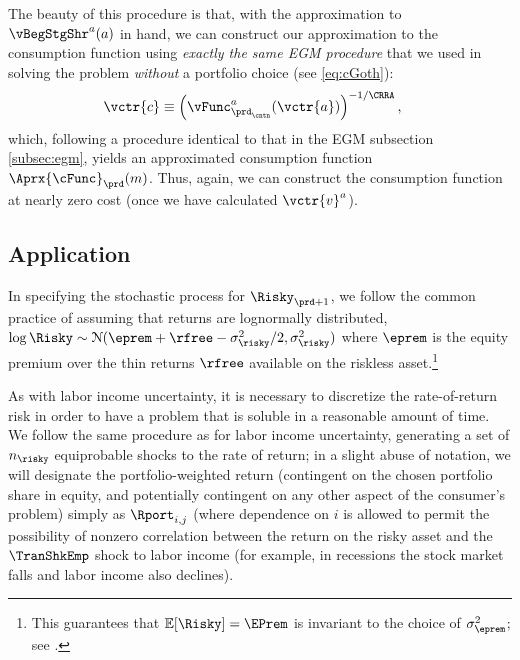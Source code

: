 The beauty of this procedure is that, with the approximation to $\vBegStgShr^{a}(a)$ in hand, we can construct our approximation to the consumption function using \emph{exactly the same EGM procedure} that we used in solving the problem \emph{without} a portfolio choice (see \eqref{eq:cGoth}):
\begin{equation}\begin{gathered}\begin{aligned}
      \vctr{c}  & \equiv  \left(\vFunc^{a}_{\prd_\cntn}(\vctr{a})\right)^{-1/\CRRA} \label{eq:cVecPort},
    \end{aligned}\end{gathered}\end{equation}
which, following a procedure identical to that in the EGM subsection \ref{subsec:egm}, yields an approximated consumption function $\Aprx{\cFunc}_{\prd}({m})$.  Thus, again, we can construct the consumption function at nearly zero cost (once we have calculated $\vctr{v}^{a}$).

\subsection{Application}\label{subsec:MCApplication}

In specifying the stochastic process for $\Risky_{\prd+1}$, we follow the common practice of assuming that returns are lognormally distributed, $\log \Risky \sim \mathcal{N}(\eprem+\rfree-\sigma^{2}_{\risky}/2,\sigma^{2}_{\risky})$ where $\eprem$ is the equity premium over the thin returns $\rfree$ available on the riskless asset.\footnote{This guarantees that $\Ex[\Risky] = \EPrem$ is invariant to the choice of $\sigma^{2}_{\eprem}$; see .}

As with labor income uncertainty, it is necessary to discretize the rate-of-return risk in order to have a problem that is soluble in a reasonable amount of time.  We follow the same procedure as for labor income uncertainty, generating a set of $n_{\risky}$ equiprobable shocks to the rate of return; in a slight abuse of notation, we will designate the portfolio-weighted return (contingent on the chosen portfolio share in equity, and potentially contingent on any other aspect of the consumer's problem) simply as $\Rport_{i,j}$ (where dependence on $i$ is allowed to permit the possibility of nonzero correlation between the return on the risky asset and the $\TranShkEmp$ shock to labor income (for example, in recessions the stock market falls and labor income also declines).


